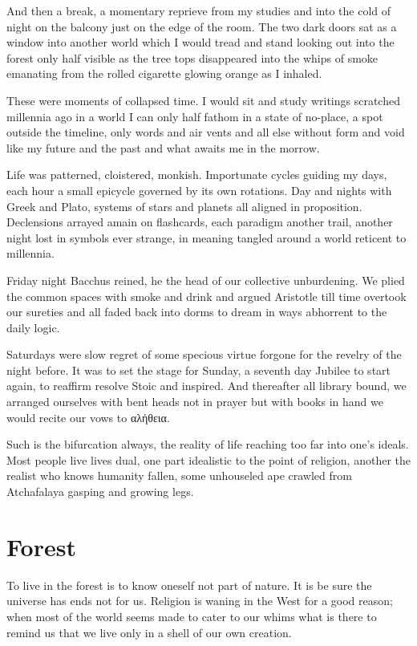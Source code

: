 \documentclass[ebook, 10pt, openright, onecolumn]{memoir}
\newcommand{\textgreek}[1]{\begingroup\fontencoding{LGR}\selectfont#1\endgroup}
\begin{document}
And then a break, a momentary reprieve from my studies and into the cold of
night on the balcony just on the edge of the room.  The two dark doors sat as a
window into another world which I would tread and stand looking out into the
forest only half visible as the tree tops disappeared into the whips of smoke
emanating from the rolled cigarette glowing orange as I inhaled.

These were moments of collapsed time.  I would sit and study writings scratched
millennia ago in a world I can only half fathom in a state of no-place, a spot
outside the timeline, only words and air vents and all else without form and
void like my future and the past and what awaits me in the morrow.

Life was patterned, cloistered, monkish.  Importunate cycles guiding my days,
each hour a small epicycle governed by its own rotations.  Day and nights with
Greek and Plato, systems of stars and planets all aligned in proposition.
Declensions arrayed amain on flashcards, each paradigm another trail, another
night lost in symbols ever strange, in meaning tangled around a world reticent
to millennia. 

Friday night Bacchus reined, he the head of our collective unburdening.  We
plied the common spaces with smoke and drink and argued Aristotle till time
overtook our sureties and all faded back into dorms to dream in ways abhorrent
to the daily logic.

Saturdays were slow regret of some specious virtue forgone for the revelry of
the night before.  It was to set the stage for Sunday, a seventh day Jubilee to
start again, to reaffirm resolve Stoic and inspired.  And thereafter all library
bound, we arranged ourselves with bent heads not in prayer but with books in
hand we would recite our vows to \textgreek{αλήθεια}.

Such is the bifurcation always, the reality of life reaching too far into one's
ideals.  Most people live lives dual, one part idealistic to the point of
religion, another the realist who knows humanity fallen, some unhouseled ape
crawled from Atchafalaya gasping and growing legs.

\chapter{Forest}
\label{cha:forest}

To live in the forest is to know oneself not part of nature.  It is be sure the
universe has ends not for us.  Religion is waning in the West for a good
reason; when most of the world seems made to cater to our whims what is there to
remind us that we live only in a shell of our own creation.
\end{document}
